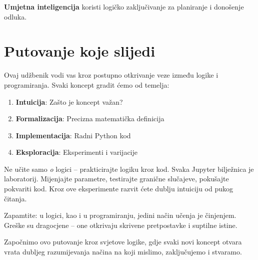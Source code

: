 \textbf{Umjetna inteligencija} koristi logičko zaključivanje za planiranje i donošenje odluka.




\section{Putovanje koje slijedi}


Ovaj udžbenik vodi vas kroz postupno otkrivanje veze između logike i programiranja. Svaki koncept gradit ćemo od temelja:


\begin{enumerate}
\item \textbf{Intuicija}: Zašto je koncept važan?
\item \textbf{Formalizacija}: Precizna matematička definicija
\item \textbf{Implementacija}: Radni Python kod
\item \textbf{Eksploracija}: Eksperimenti i varijacije
\end{enumerate}


Ne učite samo \emph{o} logici -- prakticirajte logiku kroz kod. Svaka Jupyter bilježnica je laboratorij. Mijenjajte parametre, testirajte granične slučajeve, pokušajte pokvariti kod. Kroz ove eksperimente razvit ćete dublju intuiciju od pukog čitanja.


Zapamtite: u logici, kao i u programiranju, jedini način učenja je činjenjem. Greške su dragocjene -- one otkrivaju skrivene pretpostavke i suptilne istine.


Započnimo ovo putovanje kroz svjetove logike, gdje svaki novi koncept otvara vrata dubljeg razumijevanja načina na koji mislimo, zaključujemo i stvaramo.


